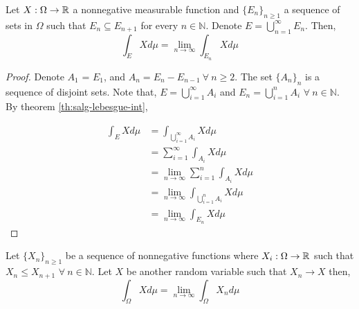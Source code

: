 \documentclass[../TGMAFFIRO.tex]{subfiles}
\begin{document}
\begin{corollary} \label{cor:partition_limit_integral}
	Let $X: \Omega \to \mathbb{R}$ a nonnegative measurable function and $\{E_n\}_{n\geq 1}$ a sequence of sets in $\Omega$ such that $E_n \subseteq E_{n+1}$ for every $n \in \mathbb{N}$. Denote $E = \bigcup_{n=1}^{\infty} E_n$. Then,
	\begin{equation}
		\int_E X d\mu = \lim_{n\to \infty} \int_{E_n} X d\mu
	\end{equation}
\end{corollary}

\begin{proof}
	Denote $A_1$ = $E_1$, and $A_n = E_n - E_{n-1} \ \forall \ n \geq 2$. The set $\{A_n\}_n$ is a sequence of disjoint sets. Note that, $E = \bigcup_{i=1}^\infty A_i$ and $E_n = \bigcup_{i=1}^n A_i$ $\forall \ n \in \mathbb{N}$.\\
	
	By theorem \ref{th:salg-lebesgue-int},
	
	\begin{align*}
		\int_E X d\mu &= \int_{\bigcup_{i=1}^{\infty} A_i} X d\mu \\
		&= \sum_{i=1}^{\infty} \int_{A_i} X d\mu \\
		&= \lim_{n\to\infty} \sum_{i=1}^{n} \int_{A_i} X d\mu \\ 
		&= \lim_{n\to\infty} \int_{\bigcup_{i=1}^{n} A_i} X d\mu \\
		&= \lim_{n\to\infty} \int_{E_n} X d\mu
	\end{align*}
\end{proof}


\begin{theorem}
Let $\{X_n\}_{n\geq 1}$ be a sequence of nonnegative functions where $X_i: \Omega \to \mathbb{R}$ such that $X_n \leq X_{n+1}$ $\forall \ n \in \mathbb{N}$. Let $X$ be another random variable such that $X_n \to X$ then,
\begin{equation}
	\int_\Omega X d\mu = \lim_{n\to \infty} \int_\Omega X_n d\mu
\end{equation}
\end{theorem}
\end{document}
